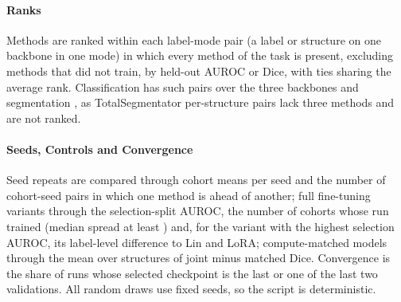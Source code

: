 \paragraph{Ranks} Methods are ranked within each label-mode pair (a label or structure on one backbone in one mode) in which every method of the task is present, excluding methods that did not train, by held-out AUROC or Dice, with ties sharing the average rank. Classification has \numRankSlotsN{} such pairs over the three backbones and segmentation \numSegrankSlotsN{}, as TotalSegmentator per-structure pairs lack three methods and are not ranked.

\paragraph{Seeds, Controls and Convergence} Seed repeats are compared through cohort means per seed and the number of cohort-seed pairs in which one method is ahead of another; full fine-tuning variants through the selection-split AUROC, the number of cohorts whose run trained (median spread at least \numSpreadMinValue{}) and, for the variant with the highest selection AUROC, its label-level difference to Lin and LoRA; compute-matched models through the mean over structures of joint minus matched Dice. Convergence is the share of runs whose selected checkpoint is the last or one of the last two validations. All random draws use fixed seeds, so the script is deterministic.
